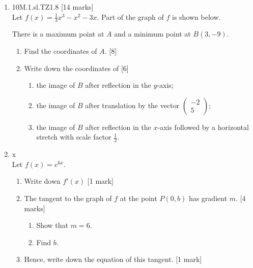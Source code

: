 \documentclass[12pt, twoside]{article}
\begin{document}
\begin{enumerate}
\item 10M.1.sl.TZ1.8 \hfill [14 marks]\\
  Let $f(x)=\frac{1}{3}x^3-x^2-3x$. Part of the graph of $f$ is shown below.
    \begin{center}
    \end{center}
  There is a maximum point at $A$ and a minimum point at $B(3, -9)$.
  \begin{enumerate}
    \item Find the coordinates of $A$. \hfill [8]
    \item Write down the coordinates of \hfill [6]
    \begin{enumerate}
      \item the image of $B$ after reflection in the $y$-axis;
      \item the image of $B$ after translation by the vector $\left( \begin{array}{c} -2 \\ 5 \end{array}\right)$;
      \item the image of $B$ after reflection in the $x$-axis followed by a horizontal stretch with scale factor $\frac{1}{2}$.
    \end{enumerate}
  \end{enumerate}



\newpage
  \item x\\
  Let $f(x)=e^{6x}$.
  \begin{enumerate}
    \item Write down $f'(x)$ [1 mark]
    \item The tangent to the graph of $f$ at the point $P(0,b)$ has gradient $m$.  [4 marks]
    \begin{enumerate}
      \item Show that $m=6$.
      \item Find $b$.
    \end{enumerate}
    \item Hence, write down the equation of this tangent. [1 mark]
  \end{enumerate}


\end{enumerate}
\end{document}
